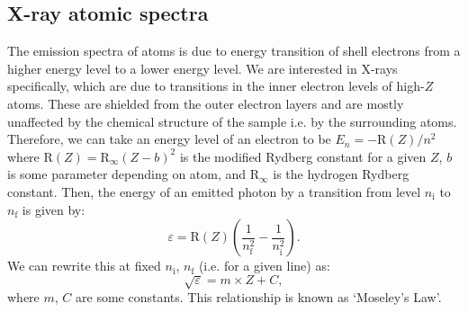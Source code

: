 \documentclass[11pt,a4paper,twoside,onecolumn]{article}
\newcommand{\rydberg}{\mathrm{R}}
\begin{document}
\subsection{X-ray atomic spectra}
The emission spectra of atoms is due to energy transition of shell electrons from a higher energy level to a lower energy level. We are interested in X-rays specifically, which are due to transitions in the inner electron levels of high-$Z$ atoms. These are shielded from the outer electron layers and are mostly unaffected by the chemical structure of the sample i.e. by the surrounding atoms. Therefore, we can take an energy level of an electron to be $E_n = -\rydberg\left(Z\right) / n^2$ where $\rydberg \left(Z\right)= \rydberg_\infty \left(Z - b\right)^2$ is the modified Rydberg constant for a given $Z$, $b$ is some parameter depending on atom, and $\rydberg_\infty$ is the hydrogen Rydberg constant. Then, the energy of an emitted photon by a transition from level $n_\mathrm{i}$ to $n_\mathrm{f}$ is given by:
\begin{equation}\label{eqn:x-ray-energy}
    \varepsilon = \rydberg\left(Z\right) \left(\frac{1}{n_\mathrm{f}^2} - \frac{1}{n_\mathrm{i}^2}\right).
\end{equation}
We can rewrite this at fixed $n_\mathrm{i}$, $n_\mathrm{f}$ (i.e. for a given line) as:
\begin{equation}
    \sqrt{\varepsilon} = m \times Z + C,
\end{equation}  where $m$, $C$ are some constants. This relationship is known as `Moseley's Law'.
\end{document}
